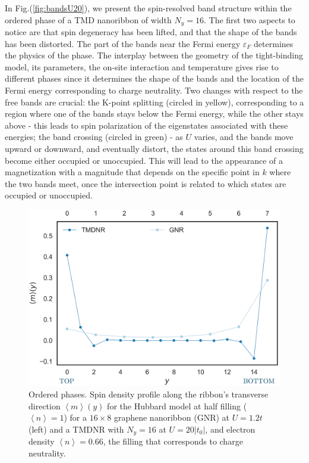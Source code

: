 In Fig.(\ref{fig:bandsU20}), we present the spin-resolved band structure within the ordered phase of a TMD nanoribbon of width $N_y = 16$.
The first two aspects to notice are that spin degeneracy has been lifted, and that the shape of the bands has been distorted.
The part of the bands near the Fermi energy $\varepsilon_F$ determines the physics of the phase.
The interplay between the geometry of the tight-binding model, its parameters, the on-site interaction and temperature gives rise to different phases since it determines the shape of the bands and the location of the Fermi energy corresponding to charge neutrality.
Two changes with respect to the free bands are crucial:
the K-point splitting (circled in yellow), corresponding to a region where one of the bands stays below the Fermi energy, while the other stays above - this leads to spin polarization of the eigenstates associated with these energies; the band crossing (circled in green) - as $U$ varies, and the bands move upward or downward, and eventually distort, the states around this band crossing become either occupied or unoccupied.
This will lead to the appearance of a magnetization with a magnitude that depends on the specific point in $k$ where the two bands meet, once the intersection point is related to which states are occupied or unoccupied.
\begin{figure}[H]
\centering
\includegraphics[scale=0.55]{images/magProf.png}
	\caption{Ordered phases.
	Spin density profile along the ribbon's transverse direction $\left\langle m \right\rangle (y)$ for the Hubbard model at half filling ($\left\langle n \right\rangle = 1$) for a $16 \times 8$ graphene nanoribbon (GNR) at $U=1.2t$ (left) and a TMDNR with $N_y = 16$ at $U = 20| t_0 |$, and electron density $\left\langle n \right\rangle = 0.66$, the filling that corresponds to charge neutrality.}
	\label{fig:nanoGraphVsTMD}
\end{figure}

